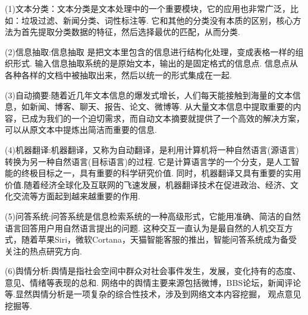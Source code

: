 \documentclass[bachelor,winfonts]{jnuthesis}
\begin{document}
(1)文本分类：文本分类是文本处理中的一个重要模块，它的应用也非常广泛，比如：垃圾过滤、新闻分类、词性标注等.
它和其他的分类没有本质的区别，核心方法为首先提取分类数据的特征，然后选择最优的匹配，从而分类.

(2)信息抽取:信息抽取 是把文本里包含的信息进行结构化处理，变成表格一样的组织形式.
输入信息抽取系统的是原始文本，输出的是固定格式的信息点.
信息点从各种各样的文档中被抽取出来，然后以统一的形式集成在一起.

(3)自动摘要:随着近几年文本信息的爆发式增长，人们每天能接触到海量的文本信息，如新闻、博客、聊天、报告、论文、微博等.
从大量文本信息中提取重要的内容，已成为我们的一个迫切需求，而自动文本摘要就提供了一个高效的解决方案，
可以从原文本中提炼出简洁而重要的信息.

(4)机器翻译:机器翻译，又称为自动翻译，是利用计算机将一种自然语言(源语言)转换为另一种自然语言(目标语言)的过程.
它是计算语言学的一个分支，是人工智能的终极目标之一，具有重要的科学研究价值.
同时，机器翻译又具有重要的实用价值.随着经济全球化及互联网的飞速发展，机器翻译技术在促进政治、经济、文化交流等方面起到越来越重要的作用.

(5)问答系统:问答系统是信息检索系统的一种高级形式，它能用准确、简洁的自然语言回答用户用自然语言提出的问题.
这种交互一直认为是最自然的人机交互方式，随着苹果Siri，微软Cortana，天猫智能客服的推出，智能问答系统成为备受关注的热点研究方向.

(6)舆情分析:舆情是指社会空间中群众对社会事件发生，发展，变化持有的态度、意见、情绪等表现的总和.
网络中的舆情主要来源包括微博，BBS论坛，新闻评论等.显然舆情分析是一项复杂的综合性技术，涉及到网络文本内容挖掘，
观点意见挖掘等.
\end{document}
